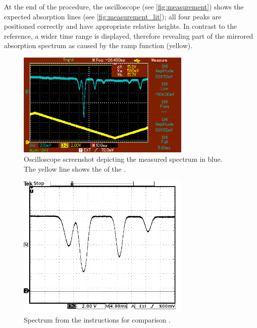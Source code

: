 At the end of the procedure,
the oscilloscope (see \autoref{fig:measurement}) shows the expected absorption lines (see \autoref{fig:measurement_lit});
all four peaks are positioned correctly and have appropriate relative heights.
In contrast to the reference,
a wider time range is displayed,
therefore revealing part of the mirrored absorption spectrum
as caused by the ramp function (yellow).

\begin{figure}
    \centering
    \includegraphics[width=0.75\textwidth, interpolate=false]{content/img/screenshot5.png}
    \caption{
        Oscilloscope screenshot depicting the measured spectrum in blue.
        The yellow line shows the  of the .
    }
    \label{fig:measurement}
\end{figure}

\begin{figure}
    \centering
    \includegraphics[width=0.75\textwidth]{content/img/p41_Fig14.png}
    \caption{Spectrum from the instructions for comparison \cite{versuchsanleitung}.}
    \label{fig:measurement_lit}
\end{figure}
